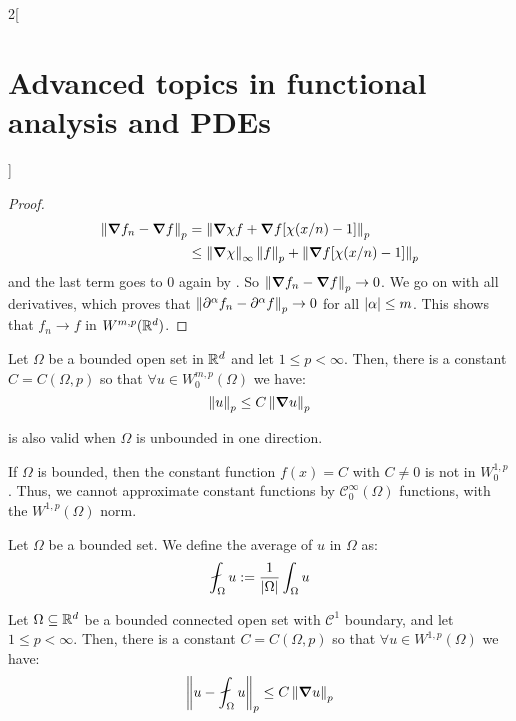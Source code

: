 \documentclass[../../../main_math.tex]{subfiles}
\begin{document}
\begin{multicols}{2}[\section{Advanced topics in functional analysis and PDEs}]
\begin{proof}
    \begin{align*}
      \left\|\grad f_n-\grad f\right\|_p & =\left\|\grad\chi f+\grad f[\chi(x/n)-1]\right\|_p                           \\
                                 & \leq \left\|\grad\chi\right\|_\infty\left\|f\right\|_p+\left\|\grad f[\chi(x/n)-1]\right\|_p
    \end{align*}
    and the last term goes to 0 again by . So $\left\|\grad f_n-\grad f\right\|_p\to 0$. We go on with all derivatives, which proves that $\left\|\partial^\alpha f_n-\partial^\alpha f\right\|_p\to 0$ for all $\abs{\alpha}\leq m$. This shows that $f_n\to f$ in $W^{m,p}(\mathbb{R}^d)$.
  \end{proof}
  \begin{theorem}\label{ATFAPDE:poincare_ineq}
    Let $\Omega$ be a bounded open set in $\mathbb{R}^d$ and let $1\leq p<\infty$. Then, there is a constant $C=C(\Omega,p)$ so that $\forall u\in W_0^{m,p}(\Omega)$ we have:
    $$
      \left\|u\right\|_p\leq C\left\|\grad u\right\|_p
    $$
  \end{theorem}
  \begin{remark}
     is also valid when $\Omega$ is unbounded in one direction.
  \end{remark}
  \begin{corollary}
    If $\Omega$ is bounded, then the constant function $f(x)=C$ with $C\ne 0$ is not in $W_0^{1,p}$. Thus, we cannot approximate constant functions by $\mathcal{C}_0^\infty(\Omega)$ functions, with the $W^{1,p}(\Omega)$ norm.
  \end{corollary}
  \begin{definition}
    Let $\Omega$ be a bounded set. We define the average of $u$ in $\Omega$ as:
    $$
      \fint_\Omega u:=\frac{1}{\abs{\Omega}}\int_\Omega u
    $$
  \end{definition}
  \begin{theorem}
    Let $\Omega\subseteq \mathbb{R}^d$ be a bounded connected open set with $\mathcal{C}^1$ boundary, and let $1\leq p<\infty$. Then, there is a constant $C=C(\Omega,p)$ so that $\forall u\in W^{1,p}(\Omega)$ we have:
    $$
      \norm{u-\fint_\Omega u}_p\leq C\norm{\grad u}_p
    $$
  \end{theorem}

\end{multicols}
\end{document}
